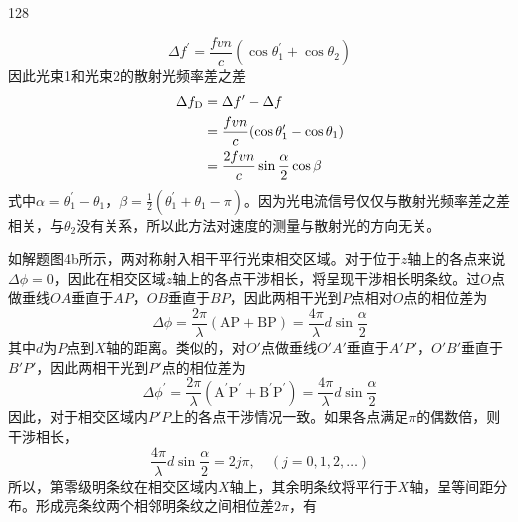 \begin{solution}{128}
\begin{subsolution}
        \begin{equation}
            \Delta f ^ {\prime} = \frac {f v n}{c} \left(\cos \theta_ {1} ^ {\prime} + \cos \theta_ {2}\right)
            \label{eq:9.s128}
        \end{equation}
        因此光束1和光束2的散射光频率差之差
        \begin{align}
            \Delta f _ {\mathrm{D}} &= \Delta f ^ {\prime} - \Delta f \notag \\
            &= \frac {f v n}{c} (\cos \theta_ {1} ^ {\prime} - \cos \theta_ {1}) \notag \\
            &= \frac {2 f v n}{c} \sin \frac {\alpha}{2} \cos \beta
            \label{eq:10.s128}
        \end{align}
        式中$\alpha = \theta_ {1} ^ {\prime} - \theta_ {1}$，$\beta = \frac {1}{2} (\theta_ {1} ^ {\prime} + \theta_ {1} - \pi)$。因为光电流信号仅仅与散射光频率差之差相关，与$\theta _ { 2 }$没有关系，所以此方法对速度的测量与散射光的方向无关。
    \end{subsolution}
    \begin{subsolution}
        如解题图4b所示，两对称射入相干平行光束相交区域。对于位于$z$轴上的各点来说$\Delta \phi = 0$，因此在相交区域$z$轴上的各点干涉相长，将呈现干涉相长明条纹。过$O$点做垂线$OA$垂直于$AP$，$OB$垂直于$BP$，因此两相干光到$P$点相对$O$点的相位差为
        \begin{equation}
            \Delta \phi = \frac {2 \pi}{\lambda} (\mathrm{AP} + \mathrm{BP}) = \frac {4 \pi}{\lambda} d \sin \frac {\alpha}{2}
            \label{eq:11.s128}
        \end{equation}
        其中$d$为$P$点到$X$轴的距离。类似的，对$O'$点做垂线$O'A'$垂直于$A'P'$，$O'B'$垂直于$B'P'$，因此两相干光到$P'$点的相位差为
        \begin{equation}
            \Delta \phi^ {\prime} = \frac {2 \pi}{\lambda} \left(\mathrm{A} ^ {\prime} \mathrm{P} ^ {\prime} + \mathrm{B} ^ {\prime} \mathrm{P} ^ {\prime}\right) = \frac {4 \pi}{\lambda} d \sin \frac {\alpha}{2}
            \label{eq:12.s128}
        \end{equation}
        因此，对于相交区域内$P'P$上的各点干涉情况一致。如果各点满足$\pi$的偶数倍，则干涉相长，
        \begin{equation}
            \frac {4 \pi}{\lambda} d \sin \frac {\alpha}{2} = 2 j \pi , \quad (j = 0, 1, 2, \dots)
            \label{eq:13.s128}
        \end{equation}
        所以，第零级明条纹在相交区域内$X$轴上，其余明条纹将平行于$X$轴，呈等间距分布。形成亮条纹两个相邻明条纹之间相位差$2\pi$，有

\end{subsolution}
\end{solution}
